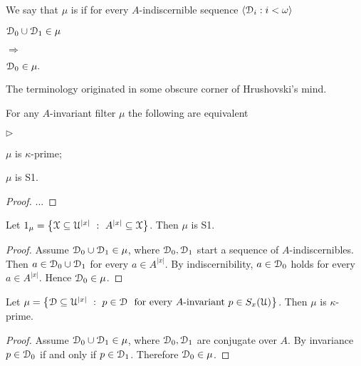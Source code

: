 \documentclass{amsproc}
\newcommand{\mylabel}[1]{{#1}\hfill}
\renewenvironment{itemize}
  {\begin{list}{$\triangleright$}{%
  \setlength{\parskip}{0mm}
  \setlength{\topsep}{.4\baselineskip}
  \setlength{\rightmargin}{0mm}
  \setlength{\listparindent}{0mm}
  \setlength{\itemindent}{0mm}
  \setlength{\labelwidth}{3ex}
  \setlength{\itemsep}{.2\baselineskip}
  \setlength{\parsep}{.2\baselineskip}
  \setlength{\partopsep}{0mm}
  \setlength{\labelsep}{1ex}
  \setlength{\leftmargin}{\labelwidth+\labelsep}
  \let\makelabel\mylabel}}{%
\end{list}}
\renewcommand*{\emph}[1]{%
   \smash{\tikz[baseline]\node[rectangle, fill=teal!25, rounded corners, inner xsep=0.5ex, inner ysep=0.2ex, anchor=base, minimum height = 2.7ex]{\strut #1};}}
\begin{document}
We say that $\mu$ is \emph{S1\/} if for every $A$-indiscernible sequence $\langle\EuScript D_i:i<\omega\rangle$
    
\def\ceq#1#2#3{\parbox[t]{25ex}{$\displaystyle #1$}\parbox{6ex}{\hfil $#2$}{$\displaystyle #3$}}

\ceq{\hfill\EuScript D_0\cup\EuScript D_1\in\mu}{\Rightarrow}{\EuScript D_0\in\mu.}

The terminology originated in some obscure corner of Hrushovski's mind.

\begin{fact}
  For any $A$-invariant filter $\mu$ the following are equivalent
  \begin{itemize}
    \item[1.] $\mu$ is $\kappa$-prime;
    \item[2.] $\mu$ is S1.
  \end{itemize}
\end{fact}

\begin{proof}
  ...
\end{proof}

\begin{example}\label{ex_mu_fin_sat}
  Let $1_\mu=\big\{\EuScript X\subseteq\EuScript U^{|x|}\ :\ A^{|x|}\subseteq\EuScript X\big\}$.
  Then $\mu$ is S1.
\end{example}

\begin{proof} 
  Assume $\EuScript D_0\cup\EuScript D_1\in\mu$, where $\EuScript D_0,\EuScript D_1$ start a sequence of $A$-indiscernibles.
  Then $a\in\EuScript D_0\cup\EuScript D_1$ for every $a\in A^{|x|}$.
  By indiscernibility, $a\in\EuScript D_0$ holds for every $a\in A^{|x|}$.
  Hence $\EuScript D_0\in\mu$.
\end{proof}


\begin{example}\label{ex_invariant_filter}
  Let $\mu=\big\{\EuScript D\subseteq\EuScript U^{|x|}\ :\ p\in\EuScript D\ {\rm\ for\ every\ } A\textrm{-invariant}\ p\in S_x(\EuScript U) \big\}$.
  Then $\mu$ is $\kappa$-prime.
\end{example}

\begin{proof}
  Assume $\EuScript D_0\cup\EuScript D_1\in\mu$, where $\EuScript D_0,\EuScript D_1$ are conjugate over $A$.
  By invariance $p\in\EuScript D_0$ if and only if $p\in\EuScript D_1$. Therefore $\EuScript D_0\in\mu$.
\end{proof}
\end{document}
